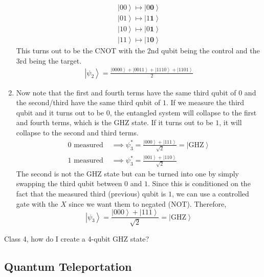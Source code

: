 \documentclass{article}
\newcommand{\ket}[1]{\ensuremath{\left|#1\right\rangle}}
\begin{document}
\begin{theorem}
\begin{enumerate}
\begin{align}
            \ket{00} \mapsto \ket{0\mathbf{0}} \\ 
            \ket{01} \mapsto \ket{1\mathbf{1}} \\ 
            \ket{10} \mapsto \ket{0\mathbf{1}} \\ 
            \ket{11} \mapsto \ket{1\mathbf{0}} 
          \end{align}
          This turns out to be the CNOT with the 2nd qubit being the control and the 3rd being the target. 
          \begin{align} 
            \ket{\psi_2} = \frac{\ket{0000} + \ket{0011} + \ket{1110} + \ket{1101}}{2} 
          \end{align}
        \item Now note that the first and fourth terms have the same third qubit of $0$ and the second/third have the same third qubit of $1$. If we measure the third qubit and it turns out to be $0$, the entangled system will collapse to the first and fourth terms, which is the GHZ state. If it turns out to be $1$, it will collapse to the second and third terms. 
          \begin{align} 
            0 \text{ measured } & \implies \psi_3^\ast = \frac{\ket{000} + \ket{111}}{\sqrt{2}} = \ket{\mathrm{GHZ}} \\
            1 \text{ measured } & \implies \psi_3^\ast = \frac{\ket{001} + \ket{110}}{\sqrt{2}}
          \end{align}
        The second is not the GHZ state but can be turned into one by simply swapping the third qubit between $0$ and $1$. Since this is conditioned on the fact that the measured third (previous) qubit is $1$, we can use a controlled gate with the $X$ since we want them to negated (NOT). Therefore, 
        \begin{equation} 
          \ket{\psi_3} = \frac{\ket{000} + \ket{111}}{\sqrt{2}} = \ket{\mathrm{GHZ}} 
        \end{equation}
      \end{enumerate}
    \end{theorem}

    \begin{question}[To Do] 
      Class 4, how do I create a 4-qubit GHZ state? 
    \end{question}

  \subsection{Quantum Teleportation} 
\end{document}
